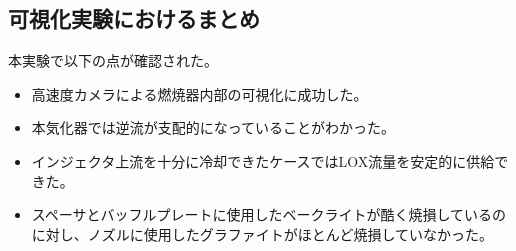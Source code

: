 \subsection{可視化実験におけるまとめ}
本実験で以下の点が確認された。
\begin{itemize}
\item 高速度カメラによる燃焼器内部の可視化に成功した。
\item 本気化器では逆流が支配的になっていることがわかった。
\item インジェクタ上流を十分に冷却できたケースではLOX流量を安定的に供給できた。
\item スペーサとバッフルプレートに使用したベークライトが酷く焼損しているのに対し、ノズルに使用したグラファイトがほとんど焼損していなかった。
\end{itemize}
